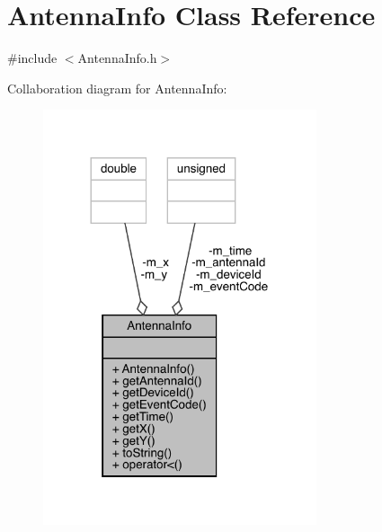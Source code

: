 \hypertarget{class_antenna_info}{}\section{Antenna\+Info Class Reference}
\label{class_antenna_info}


{\ttfamily \#include $<$Antenna\+Info.\+h$>$}



Collaboration diagram for Antenna\+Info\+:
\nopagebreak
\begin{figure}[H]
\begin{center}
\leavevmode
\includegraphics[width=228pt]{class_antenna_info__coll__graph}
\end{center}
\end{figure}
